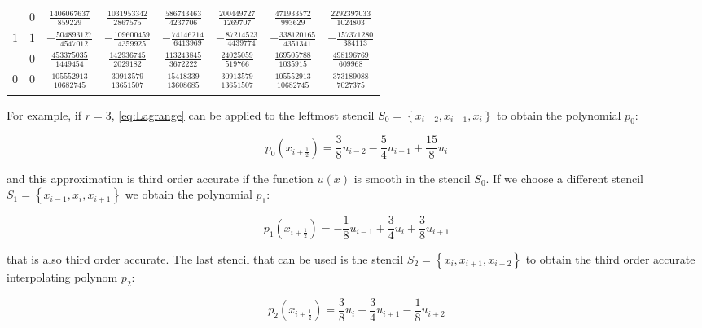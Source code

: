 \begin{table}
\begin{center}
\begin{tabular}{cccccccc}
           &  $0$  &  $ \frac{1406067637}{  859229}$  &  $ \frac{1031953342}{ 2867575}$  &  $ \frac{ 586743463}{ 4237706}$  &  $ \frac{ 200449727}{ 1269707}$  &  $ \frac{ 471933572}{  993629}$  &  $ \frac{2292397033}{ 1024803}$  \\ \addlinespace
      $1$  &  $1$  &  $-\frac{ 504893127}{ 4547012}$  &  $-\frac{ 109600459}{ 4359925}$  &  $-\frac{  74146214}{ 6413969}$  &  $-\frac{  87214523}{ 4439774}$  &  $-\frac{ 338120165}{ 4351341}$  &  $-\frac{ 157371280}{  384113}$  \\ \addlinespace
           &  $0$  &  $ \frac{ 453375035}{ 1449454}$  &  $ \frac{ 142936745}{ 2029182}$  &  $ \frac{ 113243845}{ 3672222}$  &  $ \frac{  24025059}{  519766}$  &  $ \frac{ 169505788}{ 1035915}$  &  $ \frac{ 498196769}{  609968}$  \\ \addlinespace
      $0$  &  $0$  &  $ \frac{ 105552913}{10682745}$  &  $ \frac{  30913579}{13651507}$  &  $ \frac{  15418339}{13608685}$  &  $ \frac{  30913579}{13651507}$  &  $ \frac{ 105552913}{10682745}$  &  $ \frac{ 373189088}{ 7027375}$  \\ \addlinespace
      \midrule
      \bottomrule
    \end{tabular}
  \end{center}
\end{table}

For example, if $r=3$, \eqref{eq:Lagrange} can be applied to the leftmost stencil $S_0=\left\{ x_{i-2}, x_{i-1}, x_i \right\}$ to obtain the polynomial $p_0$:

\begin{equation}
  \label{eq:pol_0}
  p_0(x_{i+\frac{1}{2}}) = \frac{3}{8} u_{i-2} - \frac{5}{4} u_{i-1} + \frac{15}{8} u_i
\end{equation}

and this approximation is third order accurate if the function $u(x)$ is smooth in the stencil $S_0$. If we choose a different stencil $S_1=\left\{ x_{i-1}, x_{i}, x_{i+1} \right\}$ we obtain the polynomial $p_1$:

\begin{equation}
  \label{eq:pol_1}
  p_1(x_{i+\frac{1}{2}}) = -\frac{1}{8} u_{i-1} + \frac{3}{4} u_i + \frac{3}{8} u_{i+1}
\end{equation}

that is also third order accurate. The last stencil that can be used is the stencil $S_2=\left\{ x_{i}, x_{i+1}, x_{i+2} \right\}$ to obtain the third order accurate interpolating polynom $p_2$:

\begin{equation}
  \label{eq:pol_2}
  p_2(x_{i+\frac{1}{2}}) = \frac{3}{8} u_i + \frac{3}{4} u_{i+1} - \frac{1}{8} u_{i+2}
\end{equation}

